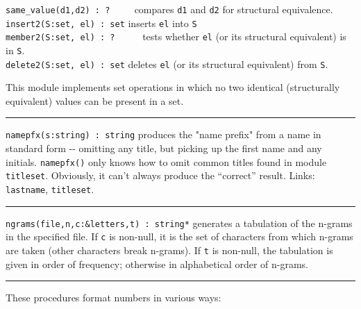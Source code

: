 \texttt{same\_value(d1,d2) : ? \ }\ \ \ compares \texttt{d1} and
\texttt{d2} for structural equivalence.\\
\texttt{insert2(S:set, el) : set} inserts \texttt{el} into \texttt{S}
\\
\texttt{member2(S:set, el) : ?} \ \ \ \ \ tests whether \texttt{el} (or
its structural equivalent) is in \texttt{S}.\\
\texttt{delete2(S:set, el) : set} deletes \texttt{el} (or its structural
equivalent) from \texttt{S}.

This module implements set operations in which no two identical
(structurally equivalent) values can be present in a set.

\vspace{0.25cm}\hrule{}

\texttt{namepfx(s:string) : string} produces the "name
prefix" from a name in standard form -{}- omitting any
title, but picking up the first name and any initials.
\texttt{namepfx()} only knows how to omit common titles found in module
\texttt{titleset}. Obviously, it can't always produce
the ``correct'' result. Links:
\texttt{lastname}, \texttt{titleset}. 

\vspace{0.25cm}\hrule{}

\texttt{ngrams(file,n,c:\&letters,t) : string*} generates a tabulation
of the n-grams in the specified file. If \texttt{c} is non-null, it is
the set of characters from which n-grams are
taken (other characters break n-grams). If \texttt{t} is non-null, the
tabulation is given in order of frequency; otherwise in alphabetical
order of n-grams. %

\vspace{0.25cm}\hrule{}

These procedures format numbers in various ways:

